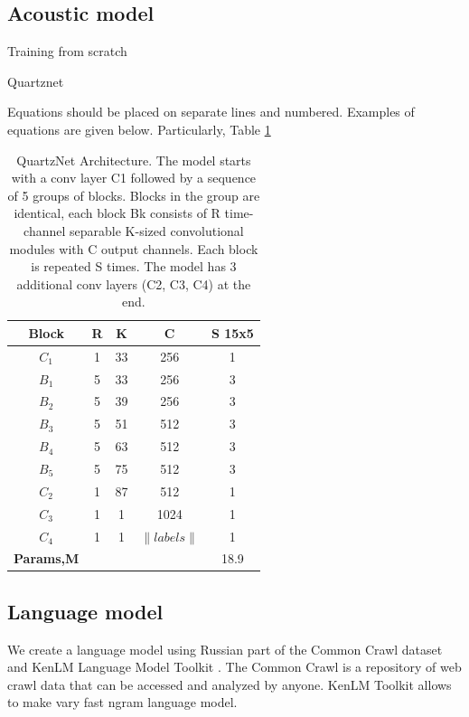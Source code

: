 \documentclass[a4paper]{article}
\begin{document}
\subsection{Acoustic model}
Training from scratch 

Quartznet \cite{kriman2020quartznet} 

Equations should be placed on separate lines and numbered. Examples of equations are given below. Particularly, 
Table \ref{tabular:Quartznet}
 
\begin{table}[t]
  \caption{QuartzNet Architecture. The model starts with a
conv layer C1 followed by a sequence of 5 groups of blocks.
Blocks in the group are identical, each block Bk consists of R
time-channel separable K-sized convolutional modules with
C output channels. Each block is repeated S times. The model
has 3 additional conv layers (C2, C3, C4) at the end.}
  \label{tabular:Quartznet}
  \centering
  \begin{tabular}{ccccc}
    \toprule
    \textbf{Block}  & \textbf{R} & \textbf{K} & \textbf{C} & \textbf{S 15x5}     \\
    \midrule
    $C_1$  & 1 & 33 & 256 &  1   \\
    \midrule
    $B_1$  & 5 & 33 & 256 &  3  \\
    $B_2$  & 5 & 39 & 256 &  3  \\
    $B_3$  & 5 & 51 & 512 &  3            \\
    $B_4$  & 5 & 63 & 512 &  3            \\
    $B_5$  & 5 & 75 & 512 &  3            \\
    \midrule
    $C_2$  & 1 & 87 & 512 &  1            \\
    $C_3$  & 1 & 1 & 1024 &  1            \\
    $C_4$  & 1 & 1 & $\|labels\|$ &  1     \\
    \bottomrule
    \textbf{Params,M}  &  &  & &  18.9     \\
  \end{tabular}
\end{table}


\subsection{Language model}

We create a language model using Russian part of the Common Crawl dataset and KenLM Language Model Toolkit \cite{heafield-2011-kenlm}. The Common Crawl is a repository of web crawl data that can be accessed and analyzed by anyone. KenLM Toolkit allows to make vary fast ngram language model.
\end{document}
